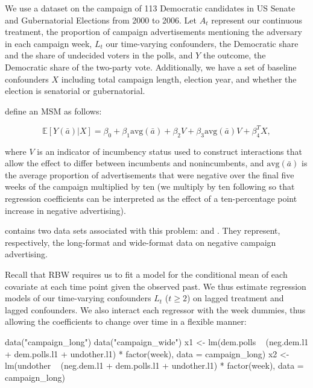 We use a dataset on the campaign of 113 Democratic candidates in US
Senate and Gubernatorial Elections from 2000 to 2006. Let \(A_{t}\)
represent our continuous treatment, the proportion of campaign
advertisements mentioning the adversary in each campaign week, \(L_{t}\)
our time-varying confounders, the Democratic share and the share of
undecided voters in the polls, and \(Y\) the outcome, the Democratic
share of the two-party vote. Additionally, we have a set of baseline
confounders \(X\) including total campaign length, election year, and
whether the election is senatorial or gubernatorial.

\citet{zhouResidualBalancingMethod2020a} define an MSM as follows:

\begin{equation}
\label{eq:15}
\mathbb{E}[Y(\bar{a})|X]=\beta_{0}+\beta_{1}\text{avg}(\bar{a})+\beta_{2}V+\beta_{3}\text{avg}(\bar{a})V+\beta_{4}^{T}X,
\end{equation}

where \(V\) is an indicator of incumbency status used to construct
interactions that allow the effect to differ between incumbents and
nonincumbents, and \(\text{avg}(\bar{a})\) is the average proportion of
advertisements that were negative over the final five weeks of the
campaign multiplied by ten (we multiply by ten following
\citet{zhouResidualBalancingMethod2020a} so that regression coefficients
can be interpreted as the effect of a ten-percentage point increase in
negative advertising).

 contains two data sets associated with this problem:
 and . They represent,
respectively, the long-format and wide-format data on negative campaign
advertising.

Recall that RBW requires us to fit a model for the conditional mean of
each covariate at each time point given the observed past. We thus
estimate regression models of our time-varying confounders \(L_{t}\)
(\(t\ge2\)) on lagged treatment and lagged confounders. We also interact
each regressor with the week dummies, thus allowing the coefficients to
change over time in a flexible manner:

\begin{Schunk}
\begin{Sinput}
data("campaign_long")
data("campaign_wide")
x1 <-
  lm(dem.polls ~ (neg.dem.l1 + dem.polls.l1 + undother.l1) * factor(week),
     data = campaign_long)
x2 <-
  lm(undother ~ (neg.dem.l1 + dem.polls.l1 + undother.l1) * factor(week),
     data = campaign_long)
\end{Sinput}
\end{Schunk}


